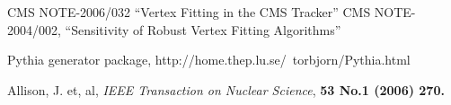 \begin{thebibliography}{99}

CMS NOTE-2006/032 ``Vertex Fitting in the CMS Tracker''
CMS NOTE-2004/002, ``Sensitivity of Robust Vertex Fitting Algorithms''

Pythia generator package, http://home.thep.lu.se/~torbjorn/Pythia.html

Allison, J. et, al, {\it IEEE Transaction on Nuclear Science}, 
\bf{53 No.1} (2006) 270.

\end{thebibliography}
